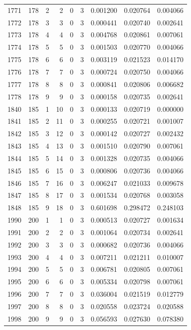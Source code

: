 \begin{longtable}{rrrrrrrrr}
1771 & 178 & 2 & 2 & 0 & 3 & 0.001200 & 0.020764 & 0.004066 \\
1772 & 178 & 3 & 3 & 0 & 3 & 0.000441 & 0.020740 & 0.002641 \\
1773 & 178 & 4 & 4 & 0 & 3 & 0.004768 & 0.020861 & 0.007061 \\
1774 & 178 & 5 & 5 & 0 & 3 & 0.001503 & 0.020770 & 0.004066 \\
1775 & 178 & 6 & 6 & 0 & 3 & 0.003119 & 0.021523 & 0.014170 \\
1776 & 178 & 7 & 7 & 0 & 3 & 0.000724 & 0.020750 & 0.004066 \\
1777 & 178 & 8 & 8 & 0 & 3 & 0.000841 & 0.020806 & 0.006682 \\
1778 & 178 & 9 & 9 & 0 & 3 & 0.000158 & 0.020735 & 0.002641 \\
1840 & 185 & 1 & 10 & 0 & 3 & 0.000133 & 0.020719 & 0.000000 \\
1841 & 185 & 2 & 11 & 0 & 3 & 0.000255 & 0.020721 & 0.001007 \\
1842 & 185 & 3 & 12 & 0 & 3 & 0.000142 & 0.020727 & 0.002432 \\
1843 & 185 & 4 & 13 & 0 & 3 & 0.001510 & 0.020790 & 0.007061 \\
1844 & 185 & 5 & 14 & 0 & 3 & 0.001328 & 0.020735 & 0.004066 \\
1845 & 185 & 6 & 15 & 0 & 3 & 0.000806 & 0.020736 & 0.004066 \\
1846 & 185 & 7 & 16 & 0 & 3 & 0.006247 & 0.021033 & 0.009678 \\
1847 & 185 & 8 & 17 & 0 & 3 & 0.001534 & 0.020768 & 0.003058 \\
1848 & 185 & 9 & 18 & 0 & 3 & 0.601698 & 0.298472 & 0.248103 \\
1990 & 200 & 1 & 1 & 0 & 3 & 0.000513 & 0.020727 & 0.001634 \\
1991 & 200 & 2 & 2 & 0 & 3 & 0.001064 & 0.020734 & 0.002641 \\
1992 & 200 & 3 & 3 & 0 & 3 & 0.000682 & 0.020736 & 0.004066 \\
1993 & 200 & 4 & 4 & 0 & 3 & 0.007211 & 0.021211 & 0.010007 \\
1994 & 200 & 5 & 5 & 0 & 3 & 0.006781 & 0.020805 & 0.007061 \\
1995 & 200 & 6 & 6 & 0 & 3 & 0.005334 & 0.020798 & 0.007061 \\
1996 & 200 & 7 & 7 & 0 & 3 & 0.036004 & 0.021519 & 0.012779 \\
1997 & 200 & 8 & 8 & 0 & 3 & 0.020558 & 0.023724 & 0.020588 \\
1998 & 200 & 9 & 9 & 0 & 3 & 0.056593 & 0.027630 & 0.078380 \\

\end{longtable}
